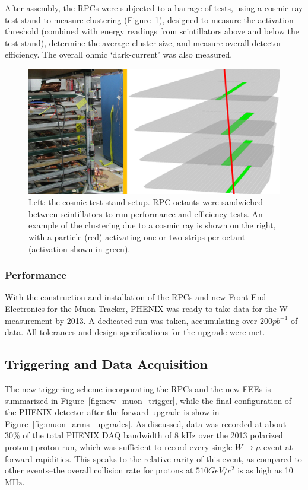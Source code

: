 
After assembly, the RPCs were subjected to a barrage of tests, using a cosmic
ray test stand to measure clustering (Figure~\ref{fig:rpc_cosmics_test_stand}),
designed to measure the activation threshold (combined with energy readings from
scintillators above and below the test stand), determine the average cluster
size, and measure overall detector efficiency. The overall ohmic `dark-current'
was also measured.

\begin{figure}
  \centering
  \includegraphics[width=\linewidth]{./figures/rpc_cosmics_test_stand}
  \caption{
    Left: the cosmic test stand setup. RPC octants were sandwiched between
    scintillators to run performance and efficiency tests. An example of the
    clustering due to a cosmic ray is shown on the right, with a particle (red)
    activating one or two strips per octant (activation shown in green).
  }
  \label{fig:rpc_cosmics_test_stand}
\end{figure}

\subsubsection{Performance}

With the construction and installation of the RPCs and new Front End Electronics
for the Muon Tracker, PHENIX was ready to take data for the W measurement by
2013. A dedicated run was taken, accumulating over $200 pb^{-1}$ of data. All
tolerances and design specifications for the upgrade were met.

\subsection{Triggering and Data Acquisition}

The new triggering scheme incorporating the RPCs and the new FEEs is summarized
in Figure~\ref{fig:new_muon_trigger}, while the final configuration of the
PHENIX detector after the forward upgrade is show in
Figure~\ref{fig:muon_arms_upgrades}. As discussed, data was recorded at about
30\% of the total PHENIX DAQ bandwidth of 8 kHz over the 2013 polarized
proton+proton run, which was sufficient to record every single $W\rightarrow\mu$
event at forward rapidities. This speaks to the relative rarity of this event,
as compared to other events--the overall collision rate for protons at $510
GeV/c^2$ is as high as 10 MHz.

